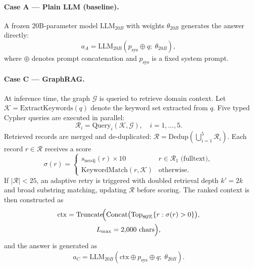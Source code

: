 \documentclass[twocolumn]{article}
\begin{document}
\paragraph{Case A --- Plain LLM (baseline).}
A frozen 20B-parameter model $\mathrm{LLM}_{20B}$ with weights $\theta_{20B}$ generates
the answer directly:
\begin{equation}
  a_A = \mathrm{LLM}_{20B}\!\left(p_{\mathrm{sys}} \oplus q;\; \theta_{20B}\right),
  \label{eq:case_a}
\end{equation}
where $\oplus$ denotes prompt concatenation and $p_{\mathrm{sys}}$ is a fixed system prompt.

\paragraph{Case C --- GraphRAG.}
At inference time, the graph $\mathcal{G}$ is queried to retrieve domain context.
Let $\mathcal{K}=\mathrm{ExtractKeywords}(q)$ denote the keyword set extracted from $q$.
Five typed Cypher queries are executed in parallel:
\begin{equation}
  \mathcal{R}_i = \mathrm{Query}_i(\mathcal{K},\mathcal{G}),\quad i=1,\ldots,5.
  \label{eq:queries}
\end{equation}
Retrieved records are merged and de-duplicated:
$\mathcal{R} = \mathrm{Dedup}\!\left(\bigcup_{i=1}^{5}\mathcal{R}_i\right)$.
Each record $r\in\mathcal{R}$ receives a score
\begin{equation}
  \sigma(r) =
  \begin{cases}
    s_{\mathrm{neo4j}}(r)\times 10 & r \in \mathcal{R}_1 \;\text{(fulltext)}, \\
    \mathrm{KeywordMatch}(r,\mathcal{K}) & \text{otherwise}.
  \end{cases}
  \label{eq:score}
\end{equation}
If $|\mathcal{R}|<25$, an adaptive retry is triggered with doubled retrieval depth $k'=2k$
and broad substring matching, updating $\mathcal{R}$ before scoring.
The ranked context is then constructed as
\begin{multline}
  \mathrm{ctx} = \mathrm{Truncate}\!\Bigl(
    \mathrm{Concat}\bigl(\mathrm{Top}_{80\%}\{r: \sigma(r)>0\}\bigr),\\
    L_{\max}=2{,}000\text{ chars}\Bigr),
  \label{eq:ctx}
\end{multline}
and the answer is generated as
\begin{equation}
  a_C = \mathrm{LLM}_{20B}\!\left(\mathrm{ctx} \oplus p_{\mathrm{sys}} \oplus q;\; \theta_{20B}\right).
  \label{eq:case_c}
\end{equation}
\end{document}
